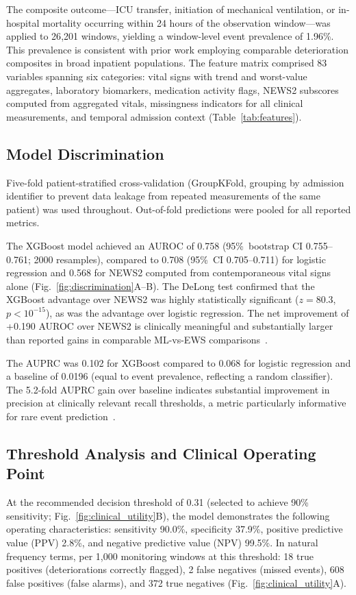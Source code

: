 \documentclass[12pt]{article}
\begin{document}
The composite outcome---ICU transfer, initiation of mechanical ventilation, or
in-hospital mortality occurring within 24 hours of the observation
window---was applied to 26{,}201 windows, yielding a window-level event
prevalence of 1.96\%. This prevalence is consistent with prior work employing
comparable deterioration composites in broad inpatient populations. The feature
matrix comprised 83 variables spanning six categories: vital signs with trend
and worst-value aggregates, laboratory biomarkers, medication activity flags,
NEWS2 subscores computed from aggregated vitals, missingness indicators for all
clinical measurements, and temporal admission context
(Table~\ref{tab:features}).

\subsection*{Model Discrimination}

Five-fold patient-stratified cross-validation (GroupKFold, grouping by
admission identifier to prevent data leakage from repeated measurements of
the same patient) was used throughout. Out-of-fold predictions were pooled
for all reported metrics.

The XGBoost model achieved an AUROC of 0.758 (95\%~bootstrap CI
0.755--0.761; 2000 resamples), compared to 0.708 (95\%~CI 0.705--0.711)
for logistic regression and 0.568 for NEWS2 computed from contemporaneous
vital signs alone (Fig.~\ref{fig:discrimination}A--B). The DeLong test
confirmed that the XGBoost advantage over NEWS2 was highly statistically
significant ($z = 80.3$, $p < 10^{-15}$), as was the advantage over
logistic regression. The net improvement of +0.190 AUROC over NEWS2 is
clinically meaningful and substantially larger than reported gains in
comparable ML-vs-EWS comparisons~\cite{henry2015, escobar2020}.

The AUPRC was 0.102 for XGBoost compared to 0.068 for logistic regression
and a baseline of 0.0196 (equal to event prevalence, reflecting a random
classifier). The 5.2-fold AUPRC gain over baseline indicates substantial
improvement in precision at clinically relevant recall thresholds,
a metric particularly informative for rare event prediction~\cite{davis2006}.

\subsection*{Threshold Analysis and Clinical Operating Point}

At the recommended decision threshold of 0.31 (selected to achieve 90\%
sensitivity; Fig.~\ref{fig:clinical_utility}B), the model demonstrates the
following operating characteristics: sensitivity 90.0\%, specificity 37.9\%,
positive predictive value (PPV) 2.8\%, and negative predictive value (NPV)
99.5\%. In natural frequency terms, per 1{,}000 monitoring windows at this
threshold: 18 true positives (deteriorations correctly flagged), 2 false
negatives (missed events), 608 false positives (false alarms), and 372
true negatives (Fig.~\ref{fig:clinical_utility}A).
\end{document}
